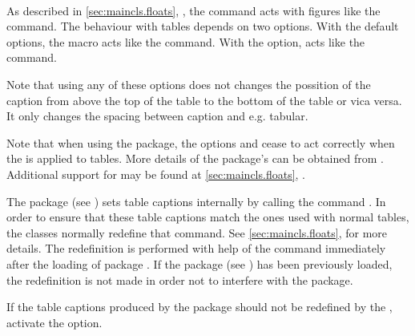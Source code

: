 \begin{Declaration}
  \\
\end{Declaration}%
%
%
As described in \autoref{sec:maincls.floats},
, the
 command acts with figures like the
 command. The behaviour with tables
depends on two options.  With the default  options,
the  macro acts like the  command. With the
 option,  acts like the
 command.

Note that using any of these options does not changes the possition of the
caption from above the top of the table to the bottom of the table or vica
versa. It only changes the spacing between caption and e.g. tabular.

Note that when using the
 package, the options  and
 cease to act correctly when the
 is applied to tables. More details of the 
package's  can be obtained from
\cite{package:float}. Additional support for  may be found at
\autoref{sec:maincls.floats}, .
%
%
%


\begin{Explain}%
\begin{Declaration}
\end{Declaration}%
%
The package
 (see \cite{package:longtable})
sets table captions internally by calling the command .
In order to ensure that these table captions match the ones used with normal
tables, the \KOMAScript{} classes normally redefine that command. See
\autoref{sec:maincls.floats},
 for more details. The
redefinition is performed with help of the command 
immediately after the loading of package .  If the package
 (see \cite{package:caption2}) has
been previously loaded, the redefinition is not made in order not to interfere
with the  package.
\end{Explain}
If the table captions produced by the  package
should not be redefined by the \KOMAScript{}, activate the
 option.
%
%


